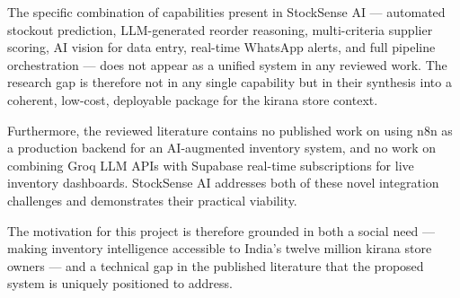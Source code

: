 The specific combination of capabilities present in StockSense AI — automated stockout prediction,
LLM-generated reorder reasoning, multi-criteria supplier scoring, AI vision for data entry,
real-time WhatsApp alerts, and full pipeline orchestration — does not appear as a unified system
in any reviewed work. The research gap is therefore not in any single capability but in their
synthesis into a coherent, low-cost, deployable package for the kirana store context.

Furthermore, the reviewed literature contains no published work on using n8n as a production
backend for an AI-augmented inventory system, and no work on combining Groq LLM APIs with
Supabase real-time subscriptions for live inventory dashboards. StockSense AI addresses both
of these novel integration challenges and demonstrates their practical viability.

The motivation for this project is therefore grounded in both a social need — making inventory
intelligence accessible to India's twelve million kirana store owners — and a technical gap in
the published literature that the proposed system is uniquely positioned to address.
